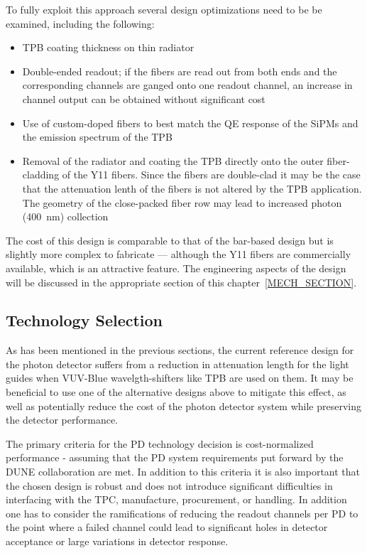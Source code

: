 To fully exploit this approach several design optimizations need to be
be examined, including the following:

\begin{itemize}

\item{TPB coating thickness on thin radiator}

\item{Double-ended readout; if the fibers are read out from both
  ends and the corresponding channels are ganged onto one readout
  channel, an increase in channel output can be obtained without
  significant cost}

\item{Use of custom-doped fibers to best match the QE response of the
  SiPMs and the emission spectrum of the TPB}

\item{Removal of the radiator and coating the TPB directly onto the outer
  fiber-cladding of the Y11 fibers. Since the fibers are double-clad
  it may be the case that the attenuation lenth of the fibers is not
  altered by the TPB application. The geometry of the close-packed
  fiber row may lead to increased photon (400~nm) collection}

\end{itemize}

The cost of this design is comparable to that of the bar-based design
but is slightly more complex to fabricate --- although the Y11 fibers
are commercially available, which is an attractive feature. The
engineering aspects of the design will be discussed in the appropriate
section of this chapter~\ref{MECH_SECTION}.

\subsection{Technology Selection}

As has been mentioned in the previous sections, the current reference
design for the photon detector suffers from a reduction in attenuation
length for the light guides when VUV-Blue wavelgth-shifters like TPB
are used on them. It may be beneficial to use one of the alternative
designs above to mitigate this effect, as well as potentially reduce
the cost of the photon detector system while preserving the detector
performance.

The primary criteria for the PD technology decision is cost-normalized
performance - assuming that the PD system requirements put forward by
the DUNE collaboration are met. In addition to this criteria it is
also important that the chosen design is robust and does not introduce
significant difficulties in interfacing with the TPC, manufacture,
procurement, or handling. In addition one has to consider the
ramifications of reducing the readout channels per PD to the point
where a failed channel could lead to significant holes in detector
acceptance or large variations in detector response. 

